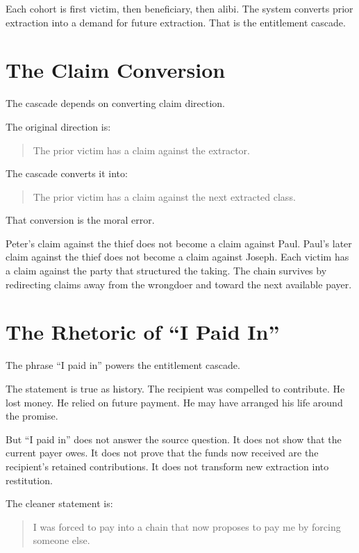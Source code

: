 \documentclass[12pt]{article}
\begin{document}
Each cohort is first victim, then beneficiary, then alibi. The system converts prior extraction into a demand for future extraction. That is the entitlement cascade.

\section{The Claim Conversion}

The cascade depends on converting claim direction.

The original direction is:

\begin{quote}
The prior victim has a claim against the extractor.
\end{quote}

The cascade converts it into:

\begin{quote}
The prior victim has a claim against the next extracted class.
\end{quote}

That conversion is the moral error.

Peter's claim against the thief does not become a claim against Paul. Paul's later claim against the thief does not become a claim against Joseph. Each victim has a claim against the party that structured the taking. The chain survives by redirecting claims away from the wrongdoer and toward the next available payer.

\section{The Rhetoric of ``I Paid In''}

The phrase ``I paid in'' powers the entitlement cascade.

The statement is true as history. The recipient was compelled to contribute. He lost money. He relied on future payment. He may have arranged his life around the promise.

But ``I paid in'' does not answer the source question. It does not show that the current payer owes. It does not prove that the funds now received are the recipient's retained contributions. It does not transform new extraction into restitution.

The cleaner statement is:

\begin{quote}
I was forced to pay into a chain that now proposes to pay me by forcing someone else.
\end{quote}
\end{document}
